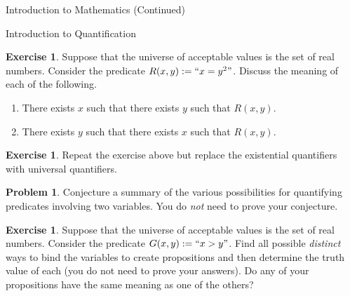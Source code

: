 \documentclass[11pt]{article}
\theoremstyle{definition}
\newtheorem{exercise}[theorem]{Exercise}
\newtheorem{problem}[theorem]{Problem}
\begin{document}
\begin{section}{Introduction to Mathematics (Continued)}
\begin{subsection}{Introduction to Quantification}
\begin{exercise}
Suppose that the universe of acceptable values is the set of real numbers.  Consider the predicate $R(x,y):=``x=y^2"$.  Discuss the meaning of each of the following.
\begin{enumerate}
\item There exists $x$ such that there exists $y$ such that $R(x,y)$.
\item There exists $y$ such that there exists $x$ such that $R(x,y)$.
\end{enumerate}
\end{exercise}

\begin{exercise}
Repeat the exercise above but replace the existential quantifiers with universal quantifiers.
\end{exercise}

\begin{problem}
Conjecture a summary of the various possibilities for quantifying predicates involving two variables.  You do \emph{not} need to prove your conjecture.
\end{problem}

\begin{exercise}
Suppose that the universe of acceptable values is the set of real numbers.  Consider the predicate $G(x,y):=``x>y"$.  Find all possible \emph{distinct} ways to bind the variables to create propositions and then determine the truth value of each (you do not need to prove your answers).  Do any of your propositions have the same meaning as one of the others?
\end{exercise}

\end{subsection}

\end{section}
\end{document}
